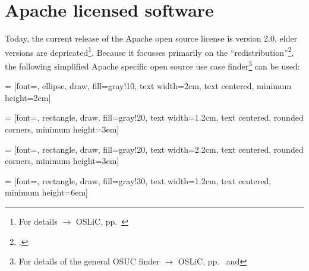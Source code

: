 %
%
%
%
%



\section{Apache licensed software}

Today, the current release of the Apache open source license is version 2.0,
elder versions are depricated\footnote{For details $\rightarrow$ OSLiC, pp.\
\pageref{sec:ProtectPowerOfApL}}. Because it focusses primarily on the
\enquote{redistribution}\footcite[cf.][\nopage wp.\ §4]{Apl20OsiLicense2004a},
the following simplified Apache specific open source use case
finder\footnote{For details of the general OSUC finder $\rightarrow$ OSLiC, pp.\
\pageref{OsucTokens} and \pageref{OsucDefinitionTree}} can be used:
 
\tikzstyle{nodv} = [font=\small, ellipse, draw, fill=gray!10, 
    text width=2cm, text centered, minimum height=2em]

 = [font=\footnotesize, rectangle, draw, fill=gray!20, 
    text width=1.2cm, text centered, rounded corners, minimum height=3em]

\tikzstyle{nodb} = [font=\footnotesize, rectangle, draw, fill=gray!20, 
    text width=2.2cm, text centered, rounded corners, minimum height=3em]
    
\tikzstyle{leaf} = [font=\tiny, rectangle, draw, fill=gray!30, 
    text width=1.2cm, text centered, minimum height=6em]

